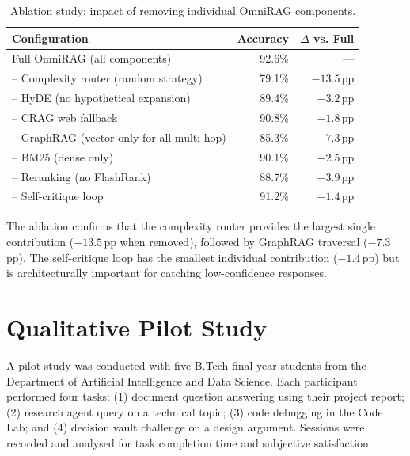 \begin{table}[ht]
    \centering
    \caption{Ablation study: impact of removing individual OmniRAG components.}
    \label{tab:ablation}
    \renewcommand{\arraystretch}{1.3}
    \begin{tabular}{lrr}
        \toprule
        \textbf{Configuration} & \textbf{Accuracy} & \textbf{$\Delta$ vs. Full} \\
        \midrule
        Full OmniRAG (all components) & 92.6\% & --- \\
        -- Complexity router (random strategy) & 79.1\% & $-13.5$\,pp \\
        -- HyDE (no hypothetical expansion) & 89.4\% & $-3.2$\,pp \\
        -- CRAG web fallback & 90.8\% & $-1.8$\,pp \\
        -- GraphRAG (vector only for all multi-hop) & 85.3\% & $-7.3$\,pp \\
        -- BM25 (dense only) & 90.1\% & $-2.5$\,pp \\
        -- Reranking (no FlashRank) & 88.7\% & $-3.9$\,pp \\
        -- Self-critique loop & 91.2\% & $-1.4$\,pp \\
        \bottomrule
    \end{tabular}
\end{table}

The ablation confirms that the complexity router provides the largest single contribution ($-13.5$\,pp when removed), followed by GraphRAG traversal ($-7.3$\,pp). The self-critique loop has the smallest individual contribution ($-1.4$\,pp) but is architecturally important for catching low-confidence responses.

\section{Qualitative Pilot Study}
\label{sec:pilot-study}

A pilot study was conducted with five B.Tech final-year students from the Department of Artificial Intelligence and Data Science. Each participant performed four tasks: (1) document question answering using their project report; (2) research agent query on a technical topic; (3) code debugging in the Code Lab; and (4) decision vault challenge on a design argument. Sessions were recorded and analysed for task completion time and subjective satisfaction.

